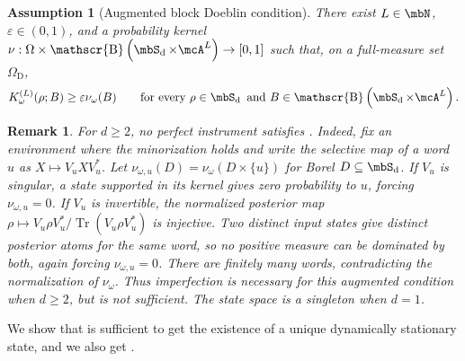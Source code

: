 \documentclass[a4paper]{article}
\numberwithin{equation}{section}   %
\theoremstyle{plain}   %
\theoremstyle{plain}   %
\newtheorem{assumption}{Assumption}     %
\newtheorem{remark}[lemma]{Remark}   %
\theoremstyle{examplestyle}
\DeclareMathOperator{\states}{\mbS_d}   %
\DeclareMathOperator{\dummyborel}{\mathscr{B}}                  %
\newcommand\borel[1]{\dummyborel\left(#1\right)}    %
\renewcommand{\tr}[1]{\operatorname{Tr}\left(#1\right)} %
\begin{document}
    \begin{assumption}[Augmented block Doeblin condition]
    \label{assumption:block-doeblin}
        There exist $L\in\mbN$, $\varepsilon\in(0,1)$, and a probability kernel $\nu:\Omega\times\borel{\states\times\mcA^L}\to[0,1]$ such that, on a full-measure set $\Omega_{\mathrm D}$,
        \begin{equation}
        \label{eq:augmented-doeblin}
             K^{(L)}_\omega(\rho;B)\ge\varepsilon\nu_\omega(B)
             \qquad\text{for every }\rho\in\states
             \text{ and }B\in\borel{\states\times\mcA^L}.
    \end{equation}
    \end{assumption}
    
    \begin{remark}
    \label{rem:doeblin-perfect-obstruction}
        For $d\ge2$, no perfect instrument satisfies . 
        Indeed, fix an environment where the minorization holds and write the selective map of a word $u$ as $X\mapsto V_uXV_u^*$.
        Let $\nu_{\omega,u}(D)=\nu_\omega(D\times\{u\})$ for Borel $D\subseteq\states$.
        If $V_u$ is singular, a state supported in its kernel gives zero probability to $u$, forcing $\nu_{\omega,u}=0$.
        If $V_u$ is invertible, the normalized posterior map $\rho\mapsto V_u\rho V_u^*/\tr{V_u\rho V_u^*}$ is injective. Two distinct input states give distinct posterior atoms for the same word, so no positive measure can be dominated by both, again forcing $\nu_{\omega,u}=0$.
        There are finitely many words, contradicting the normalization of $\nu_\omega$.
        Thus imperfection is necessary for this augmented condition when $d\ge2$, but is not sufficient. The state space is a singleton when $d=1$.
    \end{remark}

    We show that  is sufficient to get the existence of a unique dynamically stationary state, and we also get .
\end{document}

